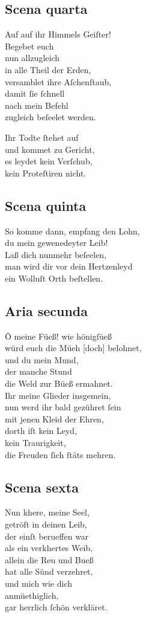 \documentclass{ees}
\newenvironment{lyrics}[1]{%
  \subsection{#1}\nopagebreak%
  \begin{lyricslist}%
  \let\voice\item%
}{%
  \end{lyricslist}%
}
\begin{document}
\begin{lyrics}{Scena quarta}
  \voice[Judex]
  Auf auf ihr Himmels Geiſter!\\
  Begebet euch\\
  nun allzugleich\\
  in alle Theil der Erden,\\
  versamblet ihre Aſchenſtaub,\\
  damit ſie ſchnell\\
  nach mein Befehl\\
  zugleich beſeelet werden.

  \voice[St: Michael]
  Ihr Todte ſtehet auf\\
  und kommet zu Gericht,\\
  es leydet kein Verſchub,\\
  kein Proteſtiren nicht.
\end{lyrics}

\begin{lyrics}{Scena quinta}
  \voice[St: Petrus]
  So komme dann, empfang den Lohn,\\
  du mein gewenedeyter Leib!\\
  Laß dich nunmehr beſeelen,\\
  man wird dir vor dein Hertzenleyd\\
  ein Wolluſt Orth beſtellen.
\end{lyrics}

\begin{lyrics}{Aria secunda}
  \voice[St: Petrus]
  Ô meine Füeß! wie hönigſüeß\\
  würd euch die Müeh [doch] belohnet,\\
  und du mein Mund,\\
  der manche Stund\\
  die Weld zur Büeß ermahnet.\\[1ex]
  Ihr meine Glieder insgemein,\\
  nun werd ihr bald gezühret ſein\\
  mit jenen Kleid der Ehren,\\
  dorth iſt kein Leyd,\\
  kein Traurigkeit,\\
  die Freuden ſich ſtäts mehren.
\end{lyrics}

\begin{lyrics}{Scena sexta}
  \voice[St: Magdalena]
  Nun khere, meine Seel,\\
  getröſt in deinen Leib,\\
  der einſt berueffen war\\
  als ein verkhertes Weib,\\
  allein die Reu und Bueß\\
  hat alle Sünd verzehret,\\
  und mich wie dich\\
  anmüethiglich,\\
  gar herrlich ſchön verkläret.
\end{lyrics}
\end{document}
